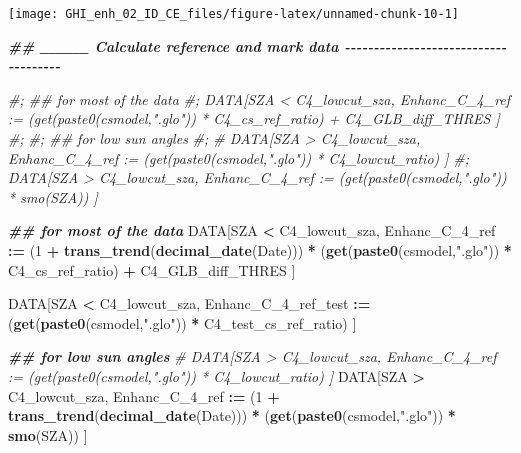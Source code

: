 \documentclass[
  10pt,
  a4paper,oneside]{article}
\newenvironment{Shaded}{\begin{snugshade}}{\end{snugshade}}
\newcommand{\AttributeTok}[1]{\textcolor[rgb]{0.13,0.29,0.53}{#1}}
\newcommand{\CommentTok}[1]{\textcolor[rgb]{0.56,0.35,0.01}{\textit{#1}}}
\newcommand{\DecValTok}[1]{\textcolor[rgb]{0.00,0.00,0.81}{#1}}
\newcommand{\DocumentationTok}[1]{\textcolor[rgb]{0.56,0.35,0.01}{\textbf{\textit{#1}}}}
\newcommand{\FunctionTok}[1]{\textcolor[rgb]{0.13,0.29,0.53}{\textbf{#1}}}
\newcommand{\NormalTok}[1]{#1}
\newcommand{\SpecialCharTok}[1]{\textcolor[rgb]{0.81,0.36,0.00}{\textbf{#1}}}
\newcommand{\StringTok}[1]{\textcolor[rgb]{0.31,0.60,0.02}{#1}}
\begin{document}
\begin{Shaded}
\end{Shaded}

\begin{center}\texttt{[image: GHI\_enh\_02\_ID\_CE\_files/figure-latex/unnamed-chunk-10-1]} \end{center}

\begin{Shaded}
\begin{Highlighting}[]
\DocumentationTok{\#\# \_\_\_\_ Calculate reference and mark data  {-}{-}{-}{-}{-}{-}{-}{-}{-}{-}{-}{-}{-}{-}{-}{-}{-}{-}{-}{-}{-}{-}{-}{-}{-}{-}{-}{-}{-}{-}{-}{-}{-}{-}{-}{-}{-}}

\CommentTok{\#; \#\# for most of the data}
\CommentTok{\#; DATA[SZA \textless{} C4\_lowcut\_sza, Enhanc\_C\_4\_ref := (get(paste0(csmodel,".glo")) * C4\_cs\_ref\_ratio) + C4\_GLB\_diff\_THRES ]}
\CommentTok{\#;}
\CommentTok{\#; \#\# for low sun angles}
\CommentTok{\#; \# DATA[SZA \textgreater{} C4\_lowcut\_sza, Enhanc\_C\_4\_ref := (get(paste0(csmodel,".glo")) * C4\_lowcut\_ratio) ]}
\CommentTok{\#; DATA[SZA \textgreater{} C4\_lowcut\_sza, Enhanc\_C\_4\_ref := (get(paste0(csmodel,".glo")) * smo(SZA)) ]}


\DocumentationTok{\#\# for most of the data}
\NormalTok{DATA[SZA }\SpecialCharTok{\textless{}}\NormalTok{ C4\_lowcut\_sza,}
\NormalTok{     Enhanc\_C\_4\_ref }\SpecialCharTok{:=}\NormalTok{ (}\DecValTok{1} \SpecialCharTok{+} \FunctionTok{trans\_trend}\NormalTok{(}\FunctionTok{decimal\_date}\NormalTok{(Date))) }\SpecialCharTok{*}\NormalTok{ (}\FunctionTok{get}\NormalTok{(}\FunctionTok{paste0}\NormalTok{(csmodel,}\StringTok{".glo"}\NormalTok{)) }\SpecialCharTok{*}\NormalTok{ C4\_cs\_ref\_ratio) }\SpecialCharTok{+}\NormalTok{ C4\_GLB\_diff\_THRES ]}

\NormalTok{DATA[SZA }\SpecialCharTok{\textless{}}\NormalTok{ C4\_lowcut\_sza,}
\NormalTok{     Enhanc\_C\_4\_ref\_test }\SpecialCharTok{:=}\NormalTok{                                    (}\FunctionTok{get}\NormalTok{(}\FunctionTok{paste0}\NormalTok{(csmodel,}\StringTok{".glo"}\NormalTok{)) }\SpecialCharTok{*}\NormalTok{ C4\_test\_cs\_ref\_ratio) ]}

\DocumentationTok{\#\# for low sun angles}
\CommentTok{\# DATA[SZA \textgreater{} C4\_lowcut\_sza, Enhanc\_C\_4\_ref := (get(paste0(csmodel,".glo")) * C4\_lowcut\_ratio) ]}
\NormalTok{DATA[SZA }\SpecialCharTok{\textgreater{}}\NormalTok{ C4\_lowcut\_sza,}
\NormalTok{     Enhanc\_C\_4\_ref }\SpecialCharTok{:=}\NormalTok{ (}\DecValTok{1} \SpecialCharTok{+} \FunctionTok{trans\_trend}\NormalTok{(}\FunctionTok{decimal\_date}\NormalTok{(Date))) }\SpecialCharTok{*}\NormalTok{ (}\FunctionTok{get}\NormalTok{(}\FunctionTok{paste0}\NormalTok{(csmodel,}\StringTok{".glo"}\NormalTok{)) }\SpecialCharTok{*} \FunctionTok{smo}\NormalTok{(SZA)) ]}


\end{Highlighting}
\end{Shaded}
\end{document}
